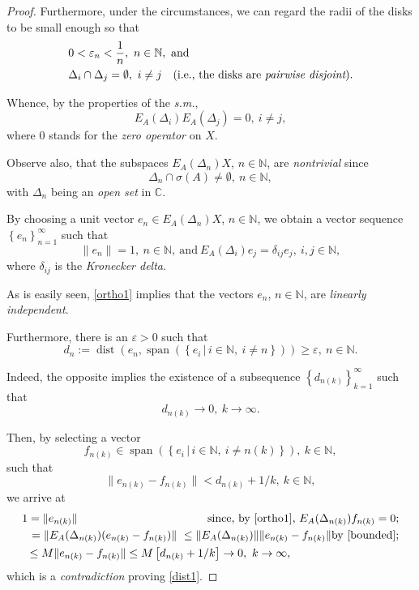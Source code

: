 \documentclass{amsart}
\theoremstyle{plain}
\theoremstyle{definition}
\begin{document}
\begin{proof}
Furthermore, under the circumstances, we can regard the radii of the disks to be small enough so that
\begin{equation}\label{radii1}
\begin{split}
&0<\varepsilon_n<\dfrac{1}{n},\ n\in{{\mathbb N}},\ \text{and}\\
&\Delta_i \cap \Delta_j=\emptyset,\ i\neq j
\quad \text{(i.e., the disks are {\it pairwise disjoint})}.
\end{split}
\end{equation}

Whence, by the properties of the {\it s.m.}, 
\begin{equation*}
E_A(\Delta_i)E_A(\Delta_j)=0,\ i\neq j,
\end{equation*}
where $0$ stands for the \textit{zero operator} on $X$.

Observe also, that the subspaces $E_A(\Delta_n)X$, $n\in {{\mathbb N}}$, are \textit{nontrivial} since
\[
\Delta_n \cap \sigma(A)\neq \emptyset,\ n\in{{\mathbb N}},
\]
with $\Delta_n$ being an \textit{open set} in ${{\mathbb C}}$. 

By choosing a unit vector $e_n\in E_A(\Delta_n)X$, $n\in{{\mathbb N}}$, we obtain a vector sequence 
$\left\{e_n\right\}_{n=1}^\infty$ such that
\begin{equation}\label{ortho1}
\|e_n\|=1,\ n\in{{\mathbb N}},\ \text{and}\ E_A(\Delta_i)e_j=\delta_{ij}e_j,\ i,j\in{{\mathbb N}},
\end{equation}
where $\delta_{ij}$ is the \textit{Kronecker delta}.

As is easily seen, \eqref{ortho1} implies that the vectors $e_n$, $n\in {{\mathbb N}}$, are \textit{linearly independent}.

Furthermore, there is an $\varepsilon>0$ such that
\begin{equation}\label{dist1}
d_n:=\operatorname{dist}\left(e_n,\operatorname{span}\left(\left\{e_i\,|\,i\in{{\mathbb N}},\ i\neq n\right\}\right)\right)\ge\varepsilon,\ n\in{{\mathbb N}}.
\end{equation}

Indeed, the opposite implies the existence of a subsequence $\left\{d_{n(k)}\right\}_{k=1}^\infty$ such that
\begin{equation*}
d_{n(k)}\to 0,\ k\to\infty.
\end{equation*}

Then, by selecting a vector
\[
f_{n(k)}\in 
\operatorname{span}\left(\left\{e_i\,|\,i\in{{\mathbb N}},\ i\neq n(k)\right\}\right),\ k\in{{\mathbb N}},
\] 
such that 
\[
\|e_{n(k)}-f_{n(k)}\|<d_{n(k)}+1/k,\ k\in{{\mathbb N}},
\]
we arrive at
\begin{multline*}
1=\|e_{n(k)}\|
\hfill
\text{since, by \eqref{ortho1}, 
$E_A(\Delta_{n(k)})f_{n(k)}=0$;}
\\
\shoveleft{
=\|E_A(\Delta_{n(k)})(e_{n(k)}-f_{n(k)})\|\
\le \|E_A(\Delta_{n(k)})\|\|e_{n(k)}-f_{n(k)}\|
\hfill
\text{by \eqref{bounded};}
}\\
\ \
\le M\|e_{n(k)}-f_{n(k)}\|\le M\left[d_{n(k)}+1/k\right]
\to 0,\ k\to\infty,
\hfill
\end{multline*}
which is a \textit{contradiction} proving \eqref{dist1}. 


\end{proof}
\end{document}
